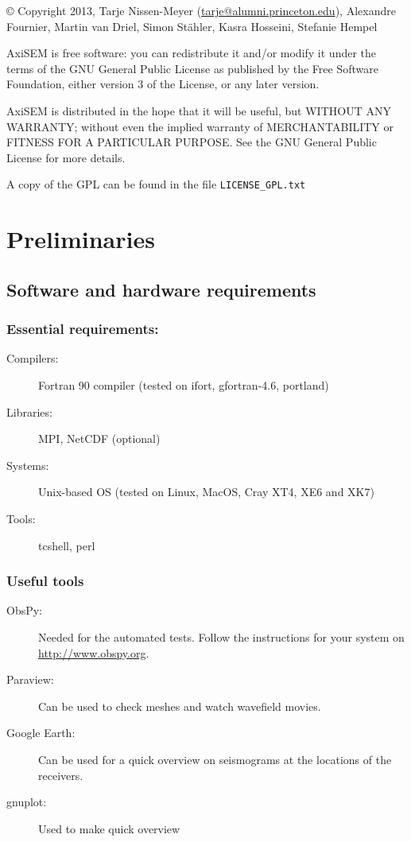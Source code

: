\documentclass[11pt,letter,fleqn,english,notitlepage]{article}
\begin{document}
\noindent \copyright  \hspace*{0.1cm} 
Copyright 2013, Tarje Nissen-Meyer (\url{tarje@alumni.princeton.edu}), Alexandre Fournier, Martin van Driel, Simon St\"{a}hler, Kasra Hosseini, Stefanie Hempel

AxiSEM is free software: you can redistribute it and/or modify it under the terms of the GNU General Public License as published by the Free Software Foundation, either version 3 of the License, or any later version.

AxiSEM is distributed in the hope that it will be useful, but WITHOUT ANY WARRANTY; without even the implied warranty of MERCHANTABILITY or FITNESS FOR A PARTICULAR PURPOSE.  See the GNU General Public License for more details.

A copy of the GPL can be found in the file \verb|LICENSE_GPL.txt|

\newpage
\tableofcontents
\newpage

\section{Preliminaries}

\subsection{Software and hardware requirements}

\subsubsection{Essential requirements:} 
\begin{description}
 \item[Compilers:] Fortran 90 compiler (tested on ifort, gfortran-4.6, portland)
 \item[Libraries:] MPI, NetCDF (optional)
 \item[Systems:] Unix-based OS (tested on Linux, MacOS, Cray XT4, XE6 and XK7)
 \item[Tools:] tcshell, perl
\end{description}
\subsubsection{Useful tools}
\begin{description}
 \item[ObsPy:] Needed for the automated tests. Follow the instructions for your system on \url{http://www.obspy.org}.
 \item[Paraview:] Can be used to check meshes and watch wavefield movies.
 \item[Google Earth:] Can be used for a quick overview on seismograms at the locations of the receivers.
 \item[gnuplot:] Used to make quick overview
\end{description}
\end{document}
